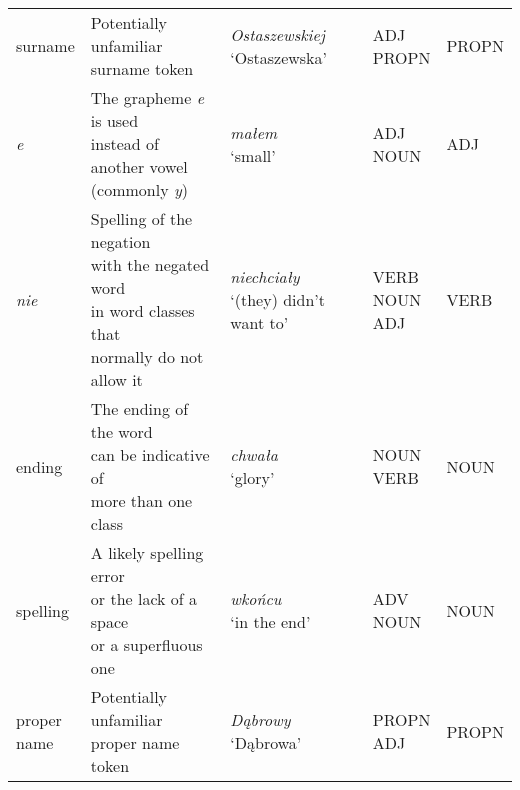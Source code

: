 \begin{longtable}[H]{p{2cm}p{4.5cm}p{3.5cm}p{1.75cm}p{1.75cm}}
surname & \makecell[l]{Potentially unfamiliar \\ surname token}  & \makecell[l]{\textit{Ostaszewskiej} \\ `Ostaszewska'} & \makecell[l]{ADJ \\ PROPN} & PROPN \\ 

\textit{e} & \makecell[l]{The grapheme \textit{e} is used \\ instead of another vowel \\ (commonly \textit{y})} & \makecell[l]{\textit{małem} \\ `small'} & \makecell[l]{ADJ \\ NOUN} & ADJ \\ 

\textit{nie} & \makecell[l]{Spelling of the negation \\ with the negated word \\ in word classes that \\ normally do not allow it} & \makecell[l]{\textit{niechciały} \\ `(they) didn't want to'} & \makecell[l]{VERB \\ NOUN \\ ADJ} & VERB  \\ 

ending & \makecell[l]{The ending of the word \\ can be indicative of \\ more than one class} & \makecell[l]{\textit{chwała} \\ `glory'} & \makecell[l]{NOUN \\ VERB} & NOUN \\ 

spelling & \makecell[l]{A likely spelling error \\ or the lack of a space \\ or a superfluous one} & \makecell[l]{\textit{wkońcu} \\ `in the end'} & \makecell[l]{ADV \\ NOUN} & NOUN \\ 

\makecell[l]{proper \\ name} & \makecell[l]{Potentially unfamiliar \\ proper name token} & \makecell[l]{\textit{Dąbrowy} \\ `Dąbrowa'} & \makecell[l]{PROPN \\ ADJ} & PROPN  \\ 


\end{longtable}
